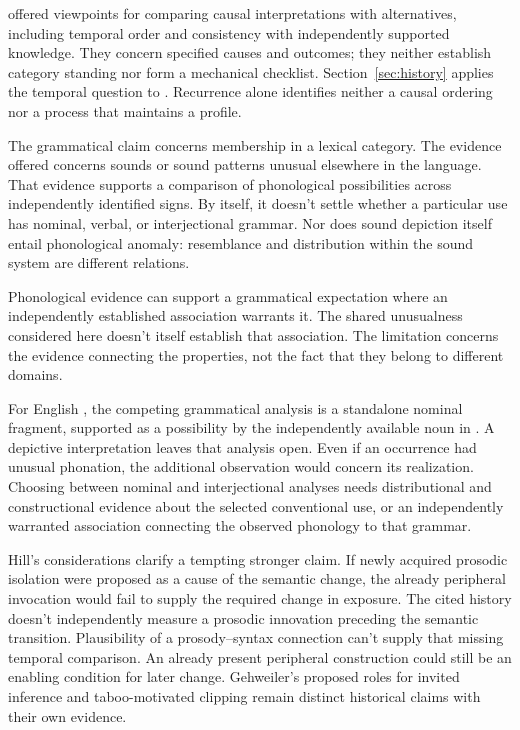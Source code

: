 \textcite[295--299]{hill1965} offered viewpoints for comparing causal
interpretations with alternatives, including temporal order and consistency
with independently supported knowledge. They concern specified causes
and outcomes; they neither establish category standing nor form a
mechanical checklist. Section~\ref{sec:history} applies the temporal
question to . Recurrence alone identifies neither a causal
ordering nor a process that maintains a profile.

The grammatical claim concerns membership in a lexical category. The
evidence offered concerns sounds or sound patterns unusual elsewhere in
the language. That evidence supports a comparison of phonological
possibilities across independently identified signs. By itself, it doesn't
settle whether a particular use has nominal, verbal, or interjectional
grammar. Nor does sound depiction itself entail phonological anomaly: resemblance
and distribution within the sound system are different relations.

Phonological evidence can support a grammatical expectation where an
independently established association warrants it. The shared unusualness
considered here doesn't itself establish that association. The limitation
concerns the evidence connecting the properties, not the fact that they
belong to different domains.

For English , the competing grammatical analysis is a
standalone nominal fragment, supported as a possibility by the independently
available noun in . A depictive interpretation leaves
that analysis open. Even if an occurrence had unusual phonation, the
additional observation would concern its realization. Choosing between
nominal and interjectional analyses needs distributional and constructional
evidence about the selected conventional use, or an independently warranted
association connecting the observed phonology to that grammar.

Hill's considerations clarify a tempting stronger claim. If newly acquired
prosodic isolation were proposed as a cause of the semantic change, the
already peripheral invocation would fail to supply the required change
in exposure. The cited history doesn't independently measure a prosodic
innovation preceding the semantic transition. Plausibility of a
prosody--syntax connection can't supply that missing temporal comparison.
An already present peripheral construction could still be an enabling
condition for later change.
Gehweiler's proposed roles for invited inference and taboo-motivated
clipping remain distinct historical claims with their own evidence.

